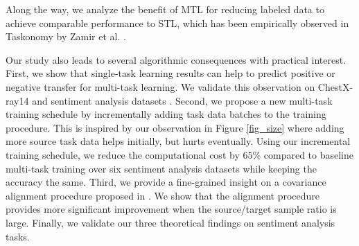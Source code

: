 \squishend
Along the way, we analyze the benefit of MTL for reducing labeled data to achieve comparable performance to STL, which has been empirically observed in Taskonomy by Zamir et al. \cite{ZSSGM18}.

Our study also leads to several algorithmic consequences with practical interest.
First, we show that single-task learning results can help to predict positive or negative transfer for multi-task learning.
We validate this observation on ChestX-ray14 \cite{chexnet17} and sentiment analysis datasets \cite{LZWDA18}.
Second, we propose a new multi-task training schedule by incrementally adding task data batches to the training procedure.
This is inspired by our observation in Figure \ref{fig_size} where adding more source task data helps initially, but hurts eventually.
Using our incremental training schedule, we reduce the computational cost by $65\%$ compared to baseline multi-task training over six sentiment analysis datasets while keeping the accuracy the same.
Third, we provide a fine-grained insight on a covariance alignment procedure proposed in \cite{WZR20}.
We show that the alignment procedure provides more significant improvement when the source/target sample ratio is large.
Finally, we validate our three theoretical findings on sentiment analysis tasks.



